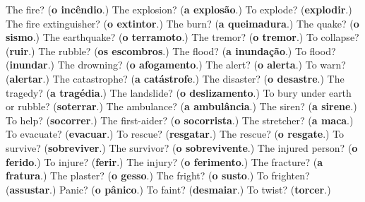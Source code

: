 \begin{tcolorbox}[breakable,colback=teal!4,colframe=teal!35!black,title={Before you move on}]
The fire? (\textbf{o incêndio}.) The explosion? (\textbf{a explosão}.) To explode? (\textbf{explodir}.) The fire extinguisher? (\textbf{o extintor}.) The burn? (\textbf{a queimadura}.) The quake? (\textbf{o sismo}.) The earthquake? (\textbf{o terramoto}.) The tremor? (\textbf{o tremor}.) To collapse? (\textbf{ruir}.) The rubble? (\textbf{os escombros}.) The flood? (\textbf{a inundação}.) To flood? (\textbf{inundar}.) The drowning? (\textbf{o afogamento}.) The alert? (\textbf{o alerta}.) To warn? (\textbf{alertar}.) The catastrophe? (\textbf{a catástrofe}.) The disaster? (\textbf{o desastre}.) The tragedy? (\textbf{a tragédia}.) The landslide? (\textbf{o deslizamento}.) To bury under earth or rubble? (\textbf{soterrar}.) The ambulance? (\textbf{a ambulância}.) The siren? (\textbf{a sirene}.) To help? (\textbf{socorrer}.) The first-aider? (\textbf{o socorrista}.) The stretcher? (\textbf{a maca}.) To evacuate? (\textbf{evacuar}.) To rescue? (\textbf{resgatar}.) The rescue? (\textbf{o resgate}.) To survive? (\textbf{sobreviver}.) The survivor? (\textbf{o sobrevivente}.) The injured person? (\textbf{o ferido}.) To injure? (\textbf{ferir}.) The injury? (\textbf{o ferimento}.) The fracture? (\textbf{a fratura}.) The plaster? (\textbf{o gesso}.) The fright? (\textbf{o susto}.) To frighten? (\textbf{assustar}.) Panic? (\textbf{o pânico}.) To faint? (\textbf{desmaiar}.) To twist? (\textbf{torcer}.)
\end{tcolorbox}
